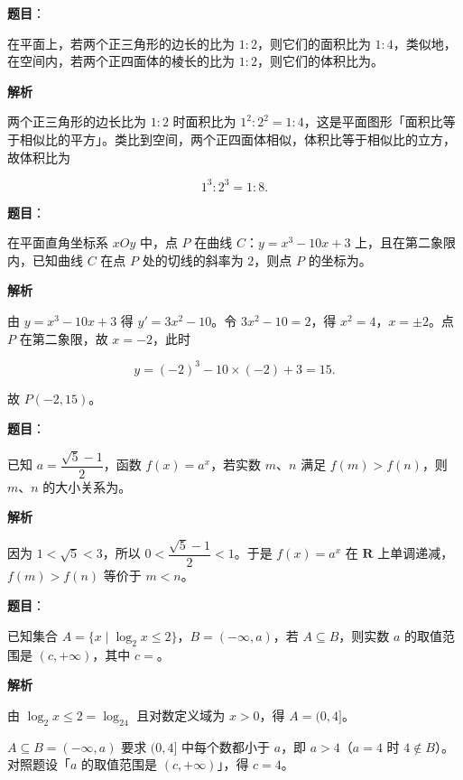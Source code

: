 \begin{answer}

\textbf{题目}：

在平面上，若两个正三角形的边长的比为 $1:2$，则它们的面积比为 $1:4$，类似地，在空间内，若两个正四面体的棱长的比为 $1:2$，则它们的体积比为\gkblank{}。

\textbf{解析}

两个正三角形的边长比为 $1:2$ 时面积比为 $1^2:2^2=1:4$，这是平面图形「面积比等于相似比的平方」。类比到空间，两个正四面体相似，体积比等于相似比的立方，故体积比为

\nopagebreak[4]
\[1^3:2^3=1:8 .\]


\end{answer}
\begin{answer}

\textbf{题目}：

在平面直角坐标系 $xOy$ 中，点 $P$ 在曲线 $C$：$y=x^3-10x+3$ 上，且在第二象限内，已知曲线 $C$ 在点 $P$ 处的切线的斜率为 $2$，则点 $P$ 的坐标为\gkblank{}。

\textbf{解析}

由 $y=x^3-10x+3$ 得 $y'=3x^2-10$。令 $3x^2-10=2$，得 $x^2=4$，$x=\pm2$。点 $P$ 在第二象限，故 $x=-2$，此时

\nopagebreak[4]
\[y=(-2)^3-10\times(-2)+3=15 .\]

故 $P(-2,15)$。


\end{answer}
\begin{answer}

\textbf{题目}：

已知 $a=\dfrac{\sqrt5-1}{2}$，函数 $f(x)=a^x$，若实数 $m$、$n$ 满足 $f(m)>f(n)$，则 $m$、$n$ 的大小关系为\gkblank{}。

\textbf{解析}

因为 $1<\sqrt5<3$，所以 $0<\dfrac{\sqrt5-1}2<1$。于是 $f(x)=a^x$ 在 $\mathbf R$ 上单调递减，$f(m)>f(n)$ 等价于 $m<n$。


\end{answer}
\begin{answer}

\textbf{题目}：

已知集合 $A=\{x\mid \log_2x\leqslant2\}$，$B=(-\infty,a)$，若 $A\subseteq B$，则实数 $a$ 的取值范围是 $(c,+\infty)$，其中 $c=$\gkblank{}。

\textbf{解析}

由 $\log_2x\leqslant2=\log_24$ 且对数定义域为 $x>0$，得 $A=(0,4]$。

$A\subseteq B=(-\infty,a)$ 要求 $(0,4]$ 中每个数都小于 $a$，即 $a>4$（$a=4$ 时 $4\notin B$）。对照题设「$a$ 的取值范围是 $(c,+\infty)$」，得 $c=4$。


\end{answer}
